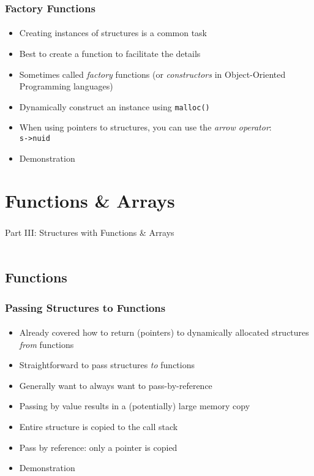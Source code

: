 \documentclass[]{beamer}
\begin{document}
\begin{frame}[fragile]
  \frametitle{Factory Functions}
  \framesubtitle{}


\begin{itemize}[<+->]
  \item Creating instances of structures is a common task
  \item Best to create a function to facilitate the details
  \item Sometimes called \emph{factory} functions (or \emph{constructors} in Object-Oriented Programming languages)
  \item Dynamically construct an instance using \texttt{malloc()}
  \item When using pointers to structures, you can use the \emph{arrow operator}:\\
  \texttt{s->nuid}
  \item Demonstration
\end{itemize}
  
\end{frame}

\section{Functions \& Arrays}

\begin{frame}
    \frametitle{}
    \framesubtitle{}
    
    \begin{center}
    {\Huge Part III: Structures with Functions \& Arrays}\\
    {\Large ~}
    \end{center}

\end{frame}

\subsection{Functions}

\begin{frame}[fragile]
  \frametitle{Passing Structures to Functions}
  \framesubtitle{}

\begin{itemize}[<+->]
  \item Already covered how to return (pointers) to dynamically allocated structures \emph{from} functions
  \item Straightforward to pass structures \emph{to} functions
  \item Generally want to always want to pass-by-reference
  \item Passing by value results in a (potentially) large memory copy
  \item Entire structure is copied to the call stack
  \item Pass by reference: only a pointer is copied
  \item Demonstration
\end{itemize}

\end{frame}
\end{document}
